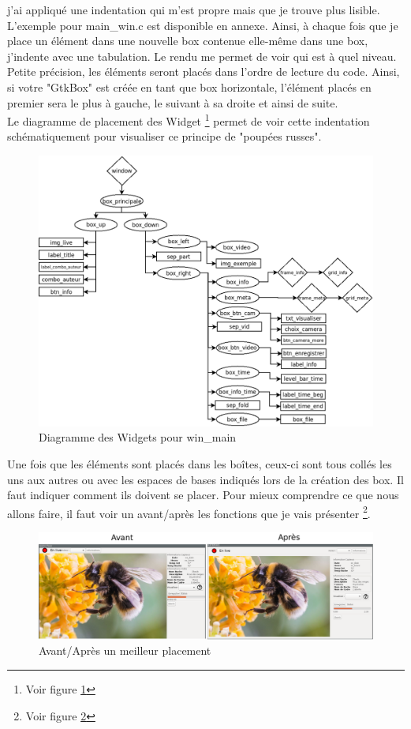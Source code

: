 \documentclass[11pt,french,a4paper]{report}
\begin{document}
j'ai appliqué une indentation  qui m'est propre mais que je trouve plus lisible. L'exemple pour main\_win.c est disponible en annexe. 
Ainsi, à chaque fois que je place un élément dans une nouvelle box contenue elle-même dans une box, j'indente avec une 
tabulation. Le rendu me permet de voir qui est à quel niveau. \\
Petite précision, les éléments seront placés dans l'ordre de lecture du code. Ainsi, si votre "GtkBox" est créée en tant
que box horizontale, l'élément placés en premier sera le plus à gauche, le suivant à sa droite et ainsi de suite. \\ 
Le diagramme de placement des Widget \footnote{Voir figure \ref{org_win_main}} permet de voir cette 
indentation schématiquement pour visualiser ce principe de "poupées russes".
\begin{figure}[!h]
\centering
\includegraphics[scale=0.5]{../images/dia/diagramme_fenetre.png} 
        \caption{Diagramme des Widgets pour win\_main}
        \label{org_win_main}
\end{figure}
Une fois que les éléments sont placés dans les boîtes, ceux-ci sont tous collés les uns aux autres ou avec 
les espaces de bases indiqués lors de la création des box. 
Il faut indiquer comment ils doivent se placer. Pour mieux comprendre ce que nous allons faire, il faut voir un 
avant/après les fonctions que je vais présenter \footnote{Voir figure \ref{avap}}.

\begin{figure}[!h]
    \centering
    \includegraphics[scale=0.4]{../images/annexes/av_ap.png} 
    \caption{Avant/Après un meilleur placement}
    \label{avap}
\end{figure}
\end{document}
